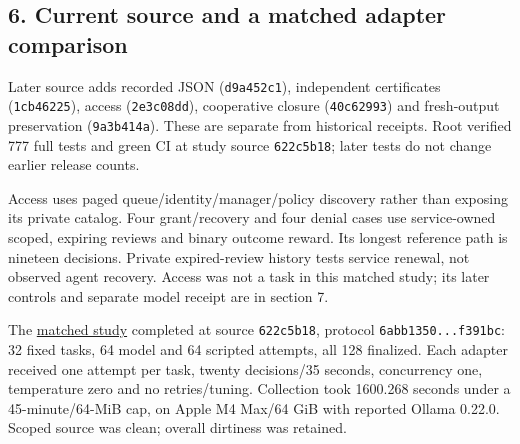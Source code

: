 \documentclass[
  11pt,
  letterpaper,
]{article}
\begin{document}
\newpage

\subsection{6. Current source and a matched adapter
comparison}\label{current-source-and-a-matched-adapter-comparison}

Later source adds recorded JSON (\texttt{d9a452c1}), independent
certificates (\texttt{1cb46225}), access (\texttt{2e3c08dd}),
cooperative closure (\texttt{40c62993}) and fresh-output preservation
(\texttt{9a3b414a}). These are separate from historical receipts. Root
verified 777 full tests and green CI at study source \texttt{622c5b18};
later tests do not change earlier release counts.

Access uses paged queue/identity/manager/policy discovery rather than
exposing its private catalog. Four grant/recovery and four denial cases
use service-owned scoped, expiring reviews and binary outcome reward.
Its longest reference path is nineteen decisions. Private expired-review
history tests service renewal, not observed agent recovery. Access was
not a task in this matched study; its later controls and separate model
receipt are in section 7.

The \href{../workflow-model-study-results.md}{matched study} completed
at source \texttt{622c5b18}, protocol \texttt{6abb1350...f391bc}: 32
fixed tasks, 64 model and 64 scripted attempts, all 128 finalized. Each
adapter received one attempt per task, twenty decisions/35 seconds,
concurrency one, temperature zero and no retries/tuning. Collection took
1600.268 seconds under a 45-minute/64-MiB cap, on Apple M4 Max/64 GiB
with reported Ollama 0.22.0. Scoped source was clean; overall dirtiness
was retained.
\end{document}
